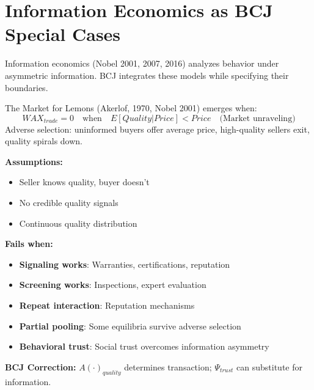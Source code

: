 
\section{Information Economics as BCJ Special Cases}
\label{sec:information-economics}

Information economics (Nobel 2001, 2007, 2016) analyzes behavior under asymmetric information. BCJ integrates these models while specifying their boundaries.


\begin{theorem}
\label{thm:akerlof-lemons}
The Market for Lemons (Akerlof, 1970, Nobel 2001) emerges when:
\begin{equation}
\boxed{WAX_{trade} = 0 \quad \text{when} \quad E[Quality | Price] < Price \quad \text{(Market unraveling)}}
\end{equation}
Adverse selection: uninformed buyers offer average price, high-quality sellers exit, quality spirals down.
\end{theorem}

\begin{tcolorbox}[colback=red!5!white, colframe=red!75!black, title=Boundary Condition: Where Lemons Model Fails]
\textbf{Assumptions:}
\begin{itemize}[nosep]
\item Seller knows quality, buyer doesn't
\item No credible quality signals
\item Continuous quality distribution
\end{itemize}

\textbf{Fails when:}
\begin{itemize}[nosep]
\item \textbf{Signaling works}: Warranties, certifications, reputation
\item \textbf{Screening works}: Inspections, expert evaluation
\item \textbf{Repeat interaction}: Reputation mechanisms
\item \textbf{Partial pooling}: Some equilibria survive adverse selection
\item \textbf{Behavioral trust}: Social trust overcomes information asymmetry
\end{itemize}

\textbf{BCJ Correction:} $A(\cdot)_{quality}$ determines transaction; $\Psi_{trust}$ can substitute for information.
\end{tcolorbox}


